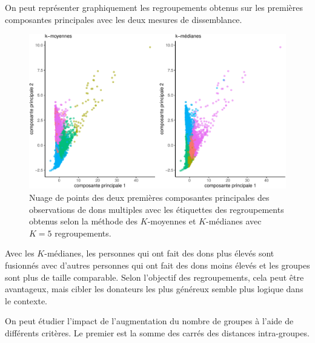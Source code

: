 \documentclass[
  11pt,
  letterpaper,
]{book}
\newenvironment{Shaded}{\begin{snugshade}}{\end{snugshade}}
\newcommand{\CommentTok}[1]{\textcolor[rgb]{0.37,0.37,0.37}{#1}}
\newcommand{\ControlFlowTok}[1]{\textcolor[rgb]{0.00,0.23,0.31}{#1}}
\newcommand{\FunctionTok}[1]{\textcolor[rgb]{0.28,0.35,0.67}{#1}}
\newcommand{\NormalTok}[1]{\textcolor[rgb]{0.00,0.23,0.31}{#1}}
\newcommand{\OtherTok}[1]{\textcolor[rgb]{0.00,0.23,0.31}{#1}}
\newcommand{\SpecialCharTok}[1]{\textcolor[rgb]{0.37,0.37,0.37}{#1}}
\theoremstyle{definition}
\theoremstyle{remark}
\begin{document}
On peut représenter graphiquement les regroupements obtenus sur les
premières composantes principales avec les deux mesures de dissemblance.

\begin{figure}[ht!]

{\centering \includegraphics[width=1\textwidth,height=\textheight]{./03-regroupements_files/figure-pdf/fig-acpkmoy5-1.pdf}

}

\caption{\label{fig-acpkmoy5}Nuage de points des deux premières
composantes principales des observations de dons multiples avec les
étiquettes des regroupements obtenus selon la méthode des \(K\)-moyennes
et \(K\)-médianes avec \(K=5\) regroupements.}

\end{figure}

Avec les \(K\)-médianes, les personnes qui ont fait des dons plus élevés
sont fusionnés avec d'autres personnes qui ont fait des dons moins
élevés et les groupes sont plus de taille comparable. Selon l'objectif
des regroupements, cela peut être avantageux, mais cibler les donateurs
les plus généreux semble plus logique dans le contexte.

On peut étudier l'impact de l'augmentation du nombre de groupes à l'aide
de différents critères. Le premier est la somme des carrés des distances
intra-groupes.

\begin{Shaded}
\end{Shaded}
\end{document}
